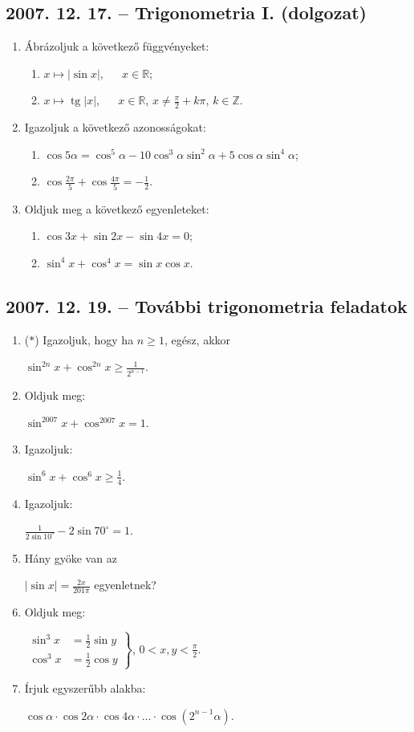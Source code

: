 \documentclass{article}
\newenvironment{abc}{\begin{enumerate}[label=\textit{\alph*})]}{\end{enumerate}}
\newcommand{\tg}{\mathop{\mathrm{tg}}\nolimits}
\begin{document}
\subsection*{2007. 12. 17. -- Trigonometria I. (dolgozat)}
\begin{enumerate}
\item Ábrázoljuk a következő függvényeket:
\begin{abc}
\item $x \mapsto |\sin x|$, $\quad$ $x \in \mathbb{R}$;
\item $x \mapsto \tg |x|$, $\quad$ $x \in \mathbb{R}$, $x \ne \frac{\pi}{2}+k\pi$, $k \in \mathbb{Z}$.
\end{abc}
\item Igazoljuk a következő azonosságokat:
\begin{abc}
\item $\cos 5\alpha=\cos^5\alpha-10\cos^3\alpha \sin^2\alpha+5\cos\alpha \sin^4\alpha$;
\item $\displaystyle{\cos\frac{2\pi}{5}+\cos\frac{4\pi}{5}=-\frac{1}{2}}$.
\end{abc}
\item Oldjuk meg a következő egyenleteket:
\begin{abc}
\item $\cos 3x+\sin 2x-\sin 4x=0$;
\item $\sin^4x+\cos^4x=\sin x\cos x$.
\end{abc}
\end{enumerate}

\subsection*{2007. 12. 19. -- További trigonometria feladatok}
\begin{enumerate}
\item ($*$) Igazoljuk, hogy ha $n \ge 1$, egész, akkor

$\sin^{2n}x+\cos^{2n}x \ge \displaystyle{\frac{1}{2^{n-1}}}$.
\item Oldjuk meg:

$\sin^{2007}x+\cos^{2007}x=1$.
\item Igazoljuk:

$\sin^6x+\cos^6x \ge \frac{1}{4}$.
\item Igazoljuk:

$\displaystyle{\frac{1}{2\sin 10^{\circ}}-2\sin 70^{\circ}=1}$.
\item Hány gyöke van az

$\displaystyle{|\sin x|=\frac{2x}{201\pi}}$ egyenletnek?
\item Oldjuk meg:

$\left.
\begin{aligned}
\sin^3x&=\frac{1}{2}\sin y\\
\cos^3x&=\frac{1}{2}\cos y
\end{aligned}
\right\}$, $0<x,y<\frac{\pi}{2}$.
\item Írjuk egyszerűbb alakba:

$\cos\alpha \cdot \cos2\alpha \cdot \cos4\alpha \cdot\ldots\cdot \cos\left(2^{n-1}\alpha\right)$.
\end{enumerate}
\end{document}
